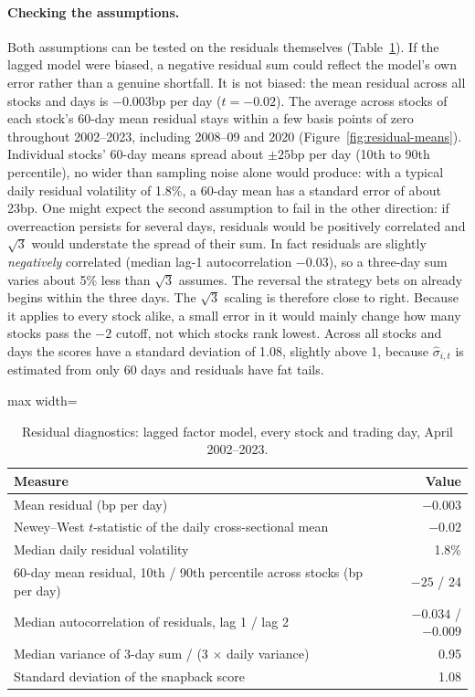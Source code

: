 \documentclass[11pt,letterpaper]{article}
\begin{document}
\paragraph{Checking the assumptions.} Both assumptions can be tested on the residuals themselves (Table~\ref{tab:residuals}). If the lagged model were biased, a negative residual sum could reflect the model's own error rather than a genuine shortfall. It is not biased: the mean residual across all stocks and days is $-0.003$bp per day ($t = -0.02$). The average across stocks of each stock's 60-day mean residual stays within a few basis points of zero throughout 2002--2023, including 2008--09 and 2020 (Figure~\ref{fig:residual-means}). Individual stocks' 60-day means spread about $\pm 25$bp per day (10th to 90th percentile), no wider than sampling noise alone would produce: with a typical daily residual volatility of 1.8\%, a 60-day mean has a standard error of about 23bp. One might expect the second assumption to fail in the other direction: if overreaction persists for several days, residuals would be positively correlated and $\sqrt{3}$ would understate the spread of their sum. In fact residuals are slightly \emph{negatively} correlated (median lag-1 autocorrelation $-0.03$), so a three-day sum varies about 5\% less than $\sqrt{3}$ assumes. The reversal the strategy bets on already begins within the three days. The $\sqrt{3}$ scaling is therefore close to right. Because it applies to every stock alike, a small error in it would mainly change how many stocks pass the $-2$ cutoff, not which stocks rank lowest. Across all stocks and days the scores have a standard deviation of 1.08, slightly above 1, because $\hat\sigma_{i,t}$ is estimated from only 60 days and residuals have fat tails.

\begin{table}[!htbp]
\centering
\caption{Residual diagnostics: lagged factor model, every stock and trading day, April 2002--2023.}
\label{tab:residuals}
\begin{adjustbox}{max width=\linewidth}
\begin{tabular}{lr}
\toprule
Measure & Value \\
\midrule
Mean residual (bp per day) & $-0.003$ \\
Newey--West $t$-statistic of the daily cross-sectional mean & $-0.02$ \\
Median daily residual volatility & 1.8\% \\
60-day mean residual, 10th / 90th percentile across stocks (bp per day) & $-25$ / 24 \\
Median autocorrelation of residuals, lag 1 / lag 2 & $-0.034$ / $-0.009$ \\
Median variance of 3-day sum / (3 $\times$ daily variance) & 0.95 \\
Standard deviation of the snapback score & 1.08 \\
\bottomrule
\end{tabular}
\end{adjustbox}
\end{table}
\end{document}
